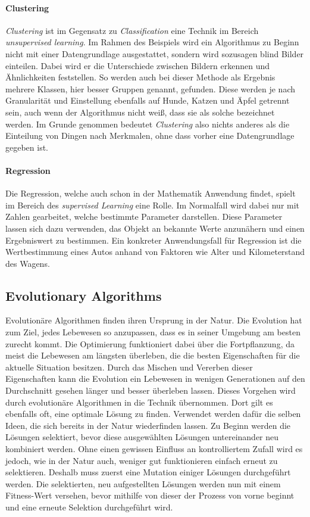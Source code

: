 \paragraph{Clustering}
\textit{Clustering} ist im Gegensatz zu \textit{Classification} eine Technik im Bereich \textit{unsupervised learning}. Im Rahmen des Beispiels wird ein Algorithmus zu Beginn nicht mit einer Datengrundlage ausgestattet, sondern wird sozusagen blind Bilder einteilen. Dabei wird er die Unterschiede zwischen Bildern erkennen und Ähnlichkeiten feststellen. So werden auch bei dieser Methode als Ergebnis mehrere Klassen, hier besser Gruppen genannt, gefunden. Diese werden je nach Granularität und Einstellung ebenfalls auf Hunde, Katzen und Äpfel getrennt sein, auch wenn der Algorithmus nicht weiß, dass sie als solche bezeichnet werden. Im Grunde genommen bedeutet \textit{Clustering} also nichts anderes als die Einteilung von Dingen nach Merkmalen, ohne dass vorher eine Datengrundlage gegeben ist. \cite{M_DL4J_Many}

\paragraph{Regression}
Die Regression, welche auch schon in der Mathematik Anwendung findet, spielt im Bereich des \textit{supervised Learning} eine Rolle. Im Normalfall wird dabei nur mit Zahlen gearbeitet, welche bestimmte Parameter darstellen. Diese Parameter lassen sich dazu verwenden, das Objekt an bekannte Werte anzunähern und einen Ergebniswert zu bestimmen. Ein konkreter Anwendungsfall für Regression ist die Wertbestimmung eines Autos anhand von Faktoren wie Alter und Kilometerstand des Wagens.

\subsection{Evolutionary Algorithms}
Evolutionäre Algorithmen finden ihren Ursprung in der Natur. Die Evolution hat zum Ziel, jedes Lebewesen so anzupassen, dass es in seiner Umgebung am besten zurecht kommt. Die Optimierung funktioniert dabei über die Fortpflanzung, da meist die Lebewesen am längsten überleben, die die besten Eigenschaften für die aktuelle Situation besitzen. Durch das Mischen und Vererben dieser Eigenschaften kann die Evolution ein Lebewesen in wenigen Generationen auf den Durchschnitt gesehen länger und besser überleben lassen. Dieses Vorgehen wird durch evolutionäre Algorithmen in die Technik übernommen. Dort gilt es ebenfalls oft, eine optimale Lösung zu finden. Verwendet werden dafür die selben Ideen, die sich bereits in der Natur wiederfinden lassen. Zu Beginn werden die Lösungen selektiert, bevor diese ausgewählten Lösungen untereinander neu kombiniert werden. Ohne einen gewissen Einfluss an kontrolliertem Zufall wird es jedoch, wie in der Natur auch, weniger gut funktionieren einfach erneut zu selektieren. Deshalb muss zuerst eine Mutation einiger Lösungen durchgeführt werden. Die selektierten, neu aufgestellten Lösungen werden nun mit einem Fitness-Wert versehen, bevor mithilfe von dieser der Prozess von vorne beginnt und eine erneute Selektion durchgeführt wird.

